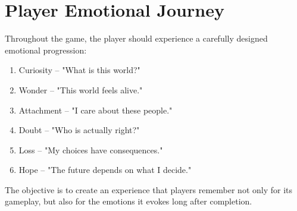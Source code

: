 \section{Player Emotional Journey}

Throughout the game, the player should experience a carefully designed emotional progression:

\begin{enumerate}
    \item Curiosity -- "What is this world?"
    \item Wonder -- "This world feels alive."
    \item Attachment -- "I care about these people."
    \item Doubt -- "Who is actually right?"
    \item Loss -- "My choices have consequences."
    \item Hope -- "The future depends on what I decide."
\end{enumerate}

The objective is to create an experience that players remember not only for its gameplay, but also for the emotions it evokes long after completion.